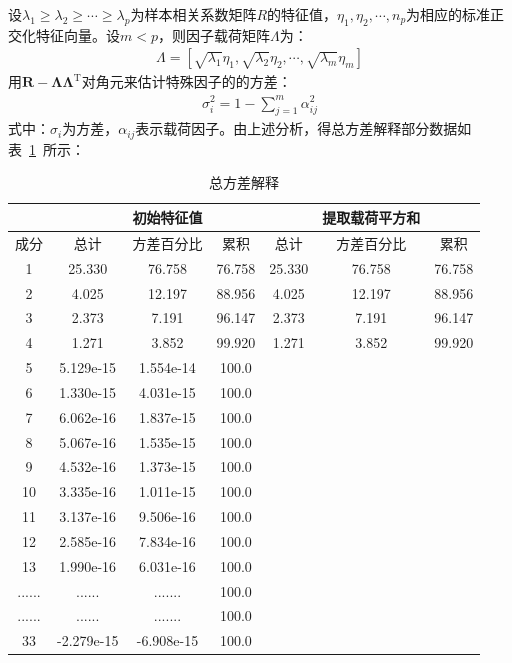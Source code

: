 \documentclass{whutmod}
\begin{document}
\begin{itemize}
	设$\lambda_{1} \geqslant \lambda_{2} \geqslant \cdots \geqslant \lambda_{p}$为样本相关系数矩阵$R$的特征值，$\eta _ { 1 } , \eta _ { 2 } , \cdots , n _ { p }$为相应的标准正交化特征向量。设$m<p$，则因子载荷矩阵$\Lambda$为：
	\begin{gather}
	\Lambda=\left[\sqrt{\lambda_{1}} \eta_{1}, \sqrt{\lambda_{2}} \eta_{2}, \cdots, \sqrt{\lambda_{m}} \eta_{m}\right]
	\end{gather}
    用$\boldsymbol{R}-\boldsymbol{\Lambda} \boldsymbol{\Lambda}^{\mathrm{T}}$对角元来估计特殊因子的的方差：
	\begin{gather}
	\sigma_{i}^{2}=1-\sum_{j=1}^{m} \alpha_{i j}^{2}
	\end{gather}
	式中：$\sigma_{i}$为方差，$\alpha_{ij}$表示载荷因子。由上述分析，得总方差解释部分数据如表~\ref{biaosan}~所示：	
		\begin{table}[H]
		\centering
		\caption{总方差解释}\label{biaosan}
		\begin{tabular}{ccccccc}
			\toprule[1.5pt]
		\multicolumn{1}{m{1cm}}{\centering } &
				\multicolumn{1}{m{1.5cm}}{\centering  } &
		 \multicolumn{1}{m{3cm}}{\centering 初始特征值} &
		 		\multicolumn{1}{m{1cm}|}{\centering  } &
		\multicolumn{1}{m{1cm}}{\centering  } &
		 \multicolumn{1}{m{3cm}}{\centering 提取载荷平方和}&
		 		\multicolumn{1}{m{1.5cm}}{\centering  } \\\hline
		\multicolumn{1}{m{1cm}|}{\centering  成分} &
		\multicolumn{1}{m{1.5cm}}{\centering  总计} &
		\multicolumn{1}{m{3cm}}{\centering  方差百分比} &
		\multicolumn{1}{m{1cm}|}{\centering  累积} &
		\multicolumn{1}{m{1cm}}{\centering  总计} &
		\multicolumn{1}{m{3cm}}{\centering  方差百分比} &				\multicolumn{1}{m{1.5cm}}{\centering  累积} \\

			\midrule[1pt]
			1&25.330&76.758&76.758&25.330&76.758&76.758 \\
			2&4.025&12.197&88.956&4.025&12.197&88.956 \\
			3&2.373&7.191&96.147&2.373&7.191&96.147 \\
			4&1.271&3.852&99.920&1.271&3.852&99.920 \\
			5&5.129e-15&1.554e-14&100.0&&& \\
			6&1.330e-15&4.031e-15&100.0&&& \\
			7&6.062e-16&1.837e-15&100.0&&& \\
			8&5.067e-16&1.535e-15&100.0&&& \\
			9&4.532e-16&1.373e-15&100.0&&& \\
			10&3.335e-16&1.011e-15&100.0&&& \\
			11&3.137e-16&9.506e-16&100.0&&& \\
			12&2.585e-16&7.834e-16&100.0&&& \\
			13&1.990e-16&6.031e-16&100.0&&& \\
			......&......&.......&100.0&&& \\
			......&......&.......&100.0&&& \\
			33&-2.279e-15&-6.908e-15&100.0&&& \\
			\bottomrule[1.5pt]
		\end{tabular}
	\end{table}
	

\end{itemize}
\end{document}
